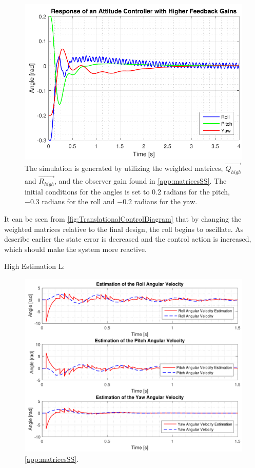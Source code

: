 \begin{figure}[H]
	\centering
	\includegraphics[scale=1]{figures/ssEqBad.pdf}
	\caption{The simulation is generated by utilizing the weighted matrices, $\vec{Q_{high}}$ and $\vec{R_{high}}$, and the observer gain found in \autoref{app:matricesSS}. The initial conditions for the angles is set to $0.2$ radians for the pitch, $-0.3$ radians for the roll and $-0.2$ radians for the yaw.}
	\label{fig:TranslationalControlDiagram}
\end{figure}

It can be seen from \autoref{fig:TranslationalControlDiagram} that by changing the weighted matrices relative to the final design, the roll begins to oscillate. As describe earlier the state error is decreased and the control action is increased, which should make the system more reactive. 



High Estimation L:

\begin{figure}[H]
	\centering
	\includegraphics[scale=0.8]{figures/ssObsHigh.pdf}
	\caption{\autoref{app:matricesSS}.}
	\label{fig:TranslationalControlDiagram}
\end{figure}

